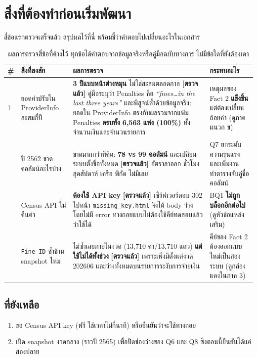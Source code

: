 \documentclass[11pt,a4paper]{article}
\newcommand{\sansall}{\sffamily}
\newcommand{\code}[1]{\texttt{#1}}
\newcommand{\ok}{\textcolor{dw}{\textbf{[ตรวจแล้ว]}}}
\begin{document}
\section{สิ่งที่ต้องทำก่อนเริ่มพัฒนา}

สี่ข้อแรกตรวจเสร็จแล้ว สรุปผลไว้ที่นี่ พร้อมชี้ว่าคำตอบไปเปลี่ยนอะไรในเอกสาร

\begin{table}[H]\centering
\begin{adjustbox}{max width=\linewidth}
\small
\begin{tabular}{L{0.6cm} L{4.6cm} L{6.6cm} L{4.6cm}}
\toprule
\sansall\bfseries \# & \sansall\bfseries สิ่งที่สงสัย &
\sansall\bfseries ผลการตรวจ & \sansall\bfseries กระทบอะไร \\
 & ยอดค่าปรับใน ProviderInfo สะสมกี่ปี &
  \textbf{3 ปีแบบหน้าต่างหมุน} ไม่ใช่สะสมตลอดกาล \ok{}
  คู่มือระบุว่า Penalties คือ \emph{``fines\ldots in the last three years''}
  และพิสูจน์ซ้ำด้วยข้อมูลจริง: ยอดใน ProviderInfo ตรงกับผลรวมจากแฟ้ม Penalties
  \textbf{ครบทั้ง 6{,}563 แห่ง (100\%)} ทั้งจำนวนเงินและจำนวนรายการ &
  เหตุผลของ Fact 2 \textbf{แข็งขึ้น} แต่ต้องเปลี่ยนถ้อยคำ (ดูภาคผนวก ข) \\
 & ปี 2562 ขาดคอลัมน์อะไรบ้าง &
  ขาดมากกว่าที่คิด: \textbf{78 vs 99 คอลัมน์} และเปลี่ยนระบบตั้งชื่อทั้งหมด
  \ok{} อัตราลาออก ชั่วโมงสุดสัปดาห์ เครือ พิกัด ไม่มีเลย &
  Q7 ยกระดับความรุนแรง และเพิ่มงานทำตารางจับคู่ชื่อคอลัมน์ \\
 & Census API ไม่คืนค่า &
  \textbf{ต้องใช้ API key} \ok{} เซิร์ฟเวอร์ตอบ 302 ไปหน้า
  \code{missing_key.html} จึงได้ body ว่างโดยไม่มี error
  ทางถอยแบบไม่ต้องใช้คีย์ทดสอบแล้วว่าใช้ได้ &
  BQ1 \textbf{ไม่ถูกบล็อกอีกต่อไป} (ดูหัวข้อแหล่งเสริม) \\
 & \code{Fine ID} ซ้ำข้าม snapshot ไหม &
  ไม่ซ้ำเลยภายในงวด (13{,}710 ค่า/13{,}710 แถว) \textbf{แต่ใช้ไม่ได้ทั้งช่วง}
  \ok{} เพราะเพิ่งมีตั้งแต่งวด 202606 และว่างทั้งหมดบนรายการระงับการจ่ายเงิน &
  คีย์ของ Fact 2 ต้องออกแบบใหม่เป็นสองระบบ (ดูกล่องแดงในภาค 3) \\
\bottomrule
\end{tabular}
\end{adjustbox}
\caption{ผลการตรวจสี่ข้อที่ค้างไว้ ทุกข้อได้คำตอบจากข้อมูลจริงหรือคู่มือฉบับทางการ ไม่มีข้อใดที่ยังต้องเดา}
\end{table}

\subsection*{ที่ยังเหลือ}
\begin{enumerate}
\item ขอ Census API key (ฟรี ใช้เวลาไม่กี่นาที) หรือยืนยันว่าจะใช้ทางถอย
\item เปิด snapshot งวดกลาง (ราวปี 2565) เพื่อปิดช่องว่างของ Q6 และ Q8
      ซึ่งตอนนี้ยืนยันได้แค่สองปลาย
\end{enumerate}
\end{document}
